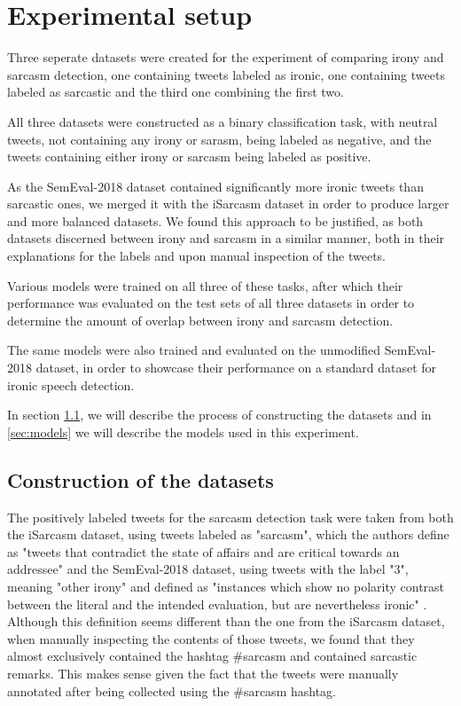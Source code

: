 \documentclass[10pt, a4paper]{article}
\begin{document}
\section{Experimental setup}

Three seperate datasets were created for the experiment of comparing irony and sarcasm detection, one containing tweets labeled
as ironic, one containing tweets labeled as sarcastic and the third one combining the first two.

All three datasets were constructed as a binary classification task, with neutral tweets, not containing any irony or sarasm,
being labeled as negative, and the tweets containing either irony or sarcasm being labeled as positive.

As the SemEval-2018 dataset contained significantly more
ironic tweets than sarcastic ones, we merged it with the iSarcasm dataset in order to produce larger and more balanced datasets.
We found this approach to be justified, as both datasets discerned between irony and sarcasm in a similar manner, both in
their explanations for the labels and upon manual inspection of the tweets. 

Various models were trained on all three of these tasks, after which their performance was evaluated on the test sets of all
three datasets in order to determine the amount of overlap between irony and sarcasm detection.

The same models were also trained and evaluated on the unmodified SemEval-2018 dataset, in order to showcase their performance
on a standard dataset for ironic speech detection.

In section \ref{sec:dataset_construction}, we will describe the process of constructing the datasets and in \ref{sec:models}
we will describe the models used in this experiment.

\subsection{Construction of the datasets}\label{sec:dataset_construction}

The positively labeled tweets for the sarcasm detection task were taken from both the iSarcasm dataset, using tweets labeled
as "sarcasm", which the authors define as "tweets that contradict the state of affairs and are critical towards an addressee"
\citep{iSarcasm} and the SemEval-2018 dataset, using tweets with the label "3", meaning "other irony" and defined as "instances
which show no polarity contrast between the literal and the intended evaluation, but are nevertheless ironic" 
\citep{semeval-2018}. Although this definition seems different than the one from the iSarcasm dataset, when manually
inspecting the contents of those tweets, we found that they almost exclusively contained the hashtag \#sarcasm and contained
sarcastic remarks. This makes sense given the fact that the tweets were manually annotated after being collected using the
\#sarcasm hashtag.
\end{document}
